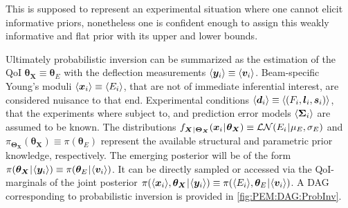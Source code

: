 This is supposed to represent an experimental situation where one cannot elicit informative priors, nonetheless one is confident enough to assign this weakly informative and flat prior with its upper and lower bounds.
\par %
Ultimately probabilistic inversion can be summarized as the estimation of the QoI \(\bm{\theta}_{\bm{X}} \equiv \bm{\theta}_E\) with the deflection measurements \(\langle{\bm{y}_i}\rangle \equiv \langle{\bm{v}_i}\rangle\).
Beam-specific Young's moduli \(\langle{\bm{x}_i}\rangle \equiv \langle{E_i}\rangle\), that are not of immediate inferential interest, are considered nuisance to that end.
Experimental conditions \(\langle{\bm{d}_i}\rangle \equiv \langle{(F_i,\bm{l}_i,\bm{s}_i)}\rangle\), that the experiments where subject to, and prediction error models \(\langle{\bm{\Sigma}_i}\rangle\) are assumed to be known.
The distributions \(f_{\bm{X} {\:\!}|{\:\!} \bm{\Theta}_{\bm{X}}} (\bm{x}_i {\:\!}|{\:\!} \bm{\theta}_{\bm{X}}) \equiv \mathcal{LN}(E_i {\:\!}|{\:\!} \mu_E,\sigma_E)\) and
\(\pi_{\bm{\Theta}_{\bm{X}}}(\bm{\theta}_{\bm{X}}) \equiv \pi(\bm{\theta}_E)\) represent the available structural and parametric prior knowledge, respectively.
The emerging posterior will be of the form \(\pi( \bm{\theta}_{\bm{X}} {\:\!}|{\:\!} \langle{\bm{y}_i}\rangle) \equiv \pi( \bm{\theta}_E {\:\!}|{\:\!} \langle{\bm{v}_i}\rangle)\).
It can be directly sampled or accessed via the QoI-marginals of the joint posterior \(\pi( \langle{\bm{x}_i}\rangle,\bm{\theta}_{\bm{X}} {\:\!}|{\:\!} \langle{\bm{y}_i}\rangle) \equiv \pi( \langle{E_i}\rangle,\bm{\theta}_E {\:\!}|{\:\!} \langle{\bm{v}_i}\rangle)\).
A DAG corresponding to probabilistic inversion is provided in \cref{fig:PEM:DAG:ProbInv}.

